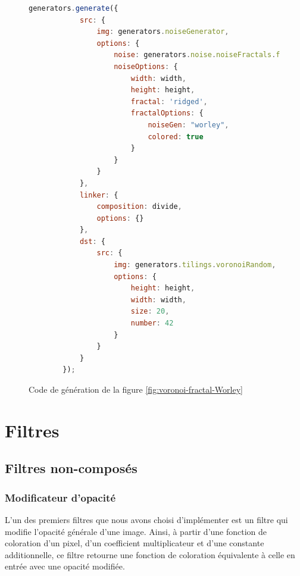 \documentclass[11pt]{article}
\begin{document}
\begin{figure}[H]
    \centering
    \begin{lstlisting}[language=JavaScript]
    generators.generate({
            src: {
                img: generators.noiseGenerator,
                options: {
                    noise: generators.noise.noiseFractals.fractal,
                    noiseOptions: {
                        width: width,
                        height: height,
                        fractal: 'ridged',
                        fractalOptions: {
                            noiseGen: "worley",
                            colored: true
                        }
                    }
                }
            },
            linker: {
                composition: divide,
                options: {}
            },
            dst: {
                src: {
                    img: generators.tilings.voronoiRandom,
                    options: {
                        height: height,
                        width: width,
                        size: 20,
                        number: 42
                    }
                }
            }
        });
    \end{lstlisting}

    \caption{Code de génération de la figure \ref{fig:voronoi-fractal-Worley}}
    \label{fig:descriptor-divide}
\end{figure}

\newpage
\section{Filtres}
\label{section:filters}

\subsection{Filtres non-composés}

\subsubsection{Modificateur d'opacité}

L'un des premiers filtres que nous avons choisi d'implémenter est un filtre qui modifie l'opacité générale d'une image. Ainsi, à partir d'une fonction de coloration d'un pixel, d'un coefficient multiplicateur et d'une constante additionnelle, ce filtre retourne une fonction de coloration équivalente à celle en entrée avec une opacité modifiée. \\
\end{document}
